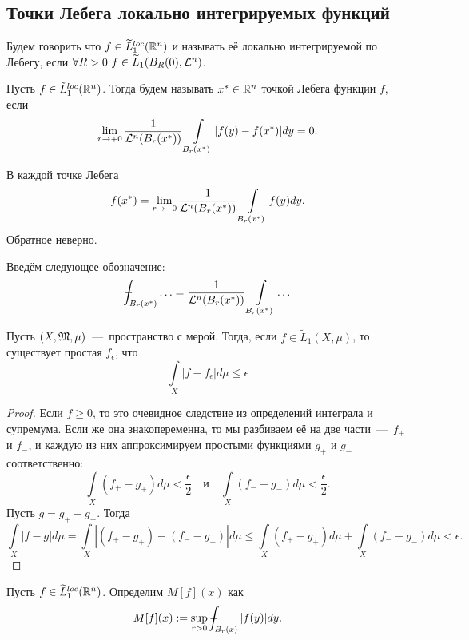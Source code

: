 \subsection{Точки Лебега локально интегрируемых функций}
\begin{definition}
    Будем говорить что $f \in \widetilde{L}_1^{loc}(\mathbb{R}^n)$ и называть её локально интегрируемой по Лебегу, если $\forall R > 0 \  f \in \widetilde{L}_1(B_R(0), \mathcal{L}^n)$.
\end{definition}
\begin{definition}
    Пусть $f \in \Tilde{L}_1^{loc}(\mathbb{R}^n)$. Тогда будем называть $x^* \in \mathbb{R}^n$ точкой Лебега функции $f$, если \[\lim\limits_{r \rightarrow +0} \dfrac{1}{\mathcal{L}^n(B_r(x^*))}\int\limits_{B_r(x^*)} |f(y) - f(x^*)|dy = 0.\]
\end{definition}
\begin{note}
    В каждой точке Лебега \[f(x^*) = \lim\limits_{r \rightarrow +0} \dfrac{1}{\mathcal{L}^n(B_r(x^*))} \int\limits_{B_r(x^*)} f(y)dy.\]
    Обратное неверно.
\end{note}
\begin{note}
    Введём следующее обозначение: \[\dashint_{B_r(x^*)} \ldots = \dfrac{1}{\LL^n(B_r(x^*))} \int\limits_{B_r(x^*)} \ldots \]
\end{note}
\begin{lemma}
    Пусть $(X, \mathfrak{M}, \mu)$~---~пространство с мерой. Тогда, если $f \in \widetilde{L}_1(X, \mu)$, то существует простая $f_\epsilon$, что \[\int\limits_X |f - f_\epsilon|d\mu \leq \epsilon\]
\end{lemma}
\begin{proof}
    Если $f \geq 0$, то это очевидное следствие из определений интеграла и супремума. Если же она знакопеременна, то мы разбиваем её на две части~---~$f_+$ и $f_-$, и каждую из них аппроксимируем простыми функциями $g_+$ и $g_-$ соответственно: \[
        \int\limits_X (f_+ - g_+)d\mu < \dfrac{\epsilon}{2} \quad \text{и} \quad \int\limits_X (f_- - g_-)d\mu < \dfrac{\epsilon}{2}.
    \]
    Пусть $g = g_+ - g_-$. Тогда \[
        \int\limits_{X}|f - g|d\mu = \int\limits_{X}|(f_+ - g_+) - (f_- - g_-)|d\mu \leq \int\limits_{X}(f_+ - g_+)d\mu + \int\limits_{X}(f_- - g_-)d\mu < \epsilon.
    \]
\end{proof}
\begin{definition}
    Пусть $f \in \widetilde{L}_1^{loc}(\mathbb{R}^n)$. Определим $M[f](x)$ как \[M[f](x) := \sup\limits_{r > 0}\dashint_{B_r(x)} |f(y)|dy.\]    
\end{definition}
